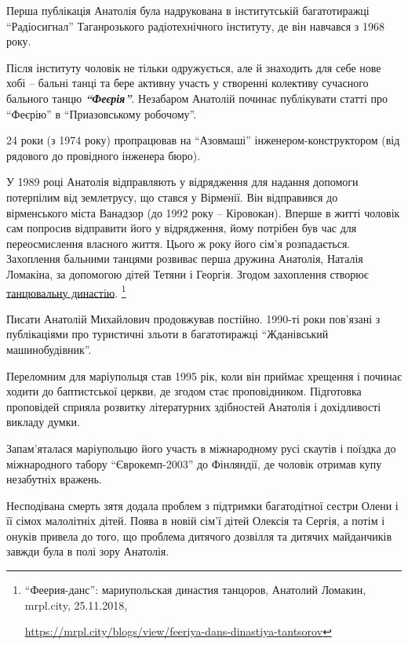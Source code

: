 Перша публікація Анатолія була надрукована в інститутській багатотиражці
\enquote{Радіосигнал} Таганрозького радіотехнічного інституту, де він навчався  з 1968
року.

Після інституту чоловік не тільки одружується, але й знаходить для себе нове
хобі – бальні танці та бере активну участь у створенні колективу сучасного
бального танцю \emph{\textbf{\enquote{Феєрія}}}. Незабаром Анатолій починає публікувати статті про
\enquote{Феєрію} в \enquote{Приазовському робочому}.

24 роки (з 1974 року) пропрацював на \enquote{Азовмаші} інженером-конструктором (від
рядового до провідного інженера бюро).


У 1989 році Анатолія відправляють у відрядження для надання допомоги потерпілим
від землетрусу, що стався у Вірменії. Він відправився до вірменського міста
Ванадзор (до 1992 року – Кіровокан). Вперше в житті чоловік сам попросив
відправити його у відрядження, йому потрібен був час для переосмислення
власного життя. Цього ж року його сім'я розпадається. Захоплення бальними
танцями розвиває перша дружина Анатолія, Наталія Ломакіна, за допомогою дітей
Тетяни і Георгія. Згодом захоплення створює \href{https://mrpl.city/blogs/view/feeriya-dans-dinastiya-tantsorov}{танцювальну династію}.%
\footnote{\enquote{Феерия-данс}: мариупольская династия танцоров, Анатолий Ломакин, mrpl.city, 25.11.2018, \par%
\url{https://mrpl.city/blogs/view/feeriya-dans-dinastiya-tantsorov}
}

Писати Анатолій Михайлович продовжував постійно. 1990-ті роки пов'язані з
публікаціями про туристичні зльоти в багатотиражці \enquote{Жданівський
машинобудівник}.

Переломним для маріупольця став 1995 рік, коли він приймає хрещення і починає
ходити до баптистської церкви, де згодом стає проповідником. Підготовка
проповідей сприяла розвитку літературних здібностей Анатолія  і дохідливості
викладу думки.

Запам'яталася маріупольцю його участь в міжнародному русі скаутів і поїздка до
міжнародного табору \enquote{Єврокемп-2003} до Фінляндії, де чоловік отримав купу
незабутніх вражень.

Несподівана смерть зятя додала проблем з підтримки багатодітної сестри Олени і
її сімох малолітніх дітей. Поява в новій сім'ї дітей Олексія та Сергія, а потім
і онуків привела до того, що проблема дитячого дозвілля та дитячих майданчиків
завжди була в полі зору Анатолія.


